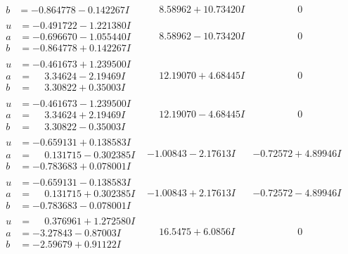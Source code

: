 \documentclass[1p]{elsarticle_modified}
\theoremstyle{definition}
\begin{document}
$$\begin{array}{c|c|c}
\begin{aligned}
b &= -0.864778 - 0.142267 I\end{aligned}
 & \phantom{-}8.58962 + 10.73420 I & \phantom{-0.000000 } 0 \\ \hline\begin{aligned}
u &= -0.491722 - 1.221380 I \\
a &= -0.696670 - 1.055440 I \\
b &= -0.864778 + 0.142267 I\end{aligned}
 & \phantom{-}8.58962 - 10.73420 I & \phantom{-0.000000 } 0 \\ \hline\begin{aligned}
u &= -0.461673 + 1.239500 I \\
a &= \phantom{-}3.34624 - 2.19469 I \\
b &= \phantom{-}3.30822 + 0.35003 I\end{aligned}
 & \phantom{-}12.19070 + 4.68445 I & \phantom{-0.000000 } 0 \\ \hline\begin{aligned}
u &= -0.461673 - 1.239500 I \\
a &= \phantom{-}3.34624 + 2.19469 I \\
b &= \phantom{-}3.30822 - 0.35003 I\end{aligned}
 & \phantom{-}12.19070 - 4.68445 I & \phantom{-0.000000 } 0 \\ \hline\begin{aligned}
u &= -0.659131 + 0.138583 I \\
a &= \phantom{-}0.131715 - 0.302385 I \\
b &= -0.783683 + 0.078001 I\end{aligned}
 & -1.00843 - 2.17613 I & -0.72572 + 4.89946 I \\ \hline\begin{aligned}
u &= -0.659131 - 0.138583 I \\
a &= \phantom{-}0.131715 + 0.302385 I \\
b &= -0.783683 - 0.078001 I\end{aligned}
 & -1.00843 + 2.17613 I & -0.72572 - 4.89946 I \\ \hline\begin{aligned}
u &= \phantom{-}0.376961 + 1.272580 I \\
a &= -3.27843 - 0.87003 I \\
b &= -2.59679 + 0.91122 I\end{aligned}
 & \phantom{-}16.5475 + 6.0856 I & \phantom{-0.000000 } 0 \\ \hline\begin{aligned}

\end{aligned}
\end{array}$$
\end{document}
